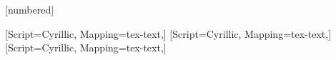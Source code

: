 



\newcommand{\MP}[1]{\mode<presentation>{#1} }
\newcommand{\MA}[1]{\mode<article>{#1} }

\newcommand{\ABS}[1]{\left| #1 \right|}

\newcommand{\HREF}[2]{{\color{blue}\underline{\href{#1}{#2}}}}

[numbered]





\usepackage{ifthen}

\usepackage{tikz}
\usetikzlibrary{arrows.meta}

\usepackage{fp}
\usepackage{tikz-3dplot}
\usepackage{environ}
\usepackage{animate}




\usepackage{xcolor}

\usepackage{amsmath} %


\usepackage[e]{esvect}  %
\newcommand{\VV}[1]{\vv{#1\mathstrut}}



\usepackage{graphicx} %


\usepackage{multimedia}

\usepackage{polyglossia}
\setdefaultlanguage{russian}


\usepackage{fontspec}

\setmainfont{Times New Roman} [Script=Cyrillic, Mapping=tex-text,]
\setsansfont{Arial} [Script=Cyrillic, Mapping=tex-text,]
\setmonofont{Courier New} [Script=Cyrillic, Mapping=tex-text,]



